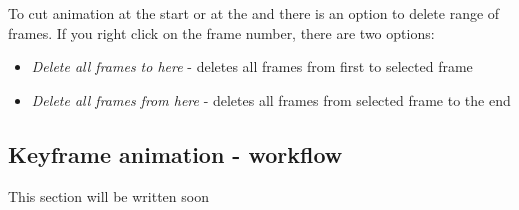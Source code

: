 	To cut animation at the start or at the and there is an option to delete range of frames. If you right click on the frame number, there are two options:
	\begin{itemize}
		\item \emph{Delete all frames to here} - deletes all frames from first to selected frame
		\item \emph{Delete all frames from here} - deletes all frames from selected frame to the end
	\end{itemize}
	
	
	


\subsection{Keyframe animation - workflow}\label{keyframe-animation}

	This section will be written soon